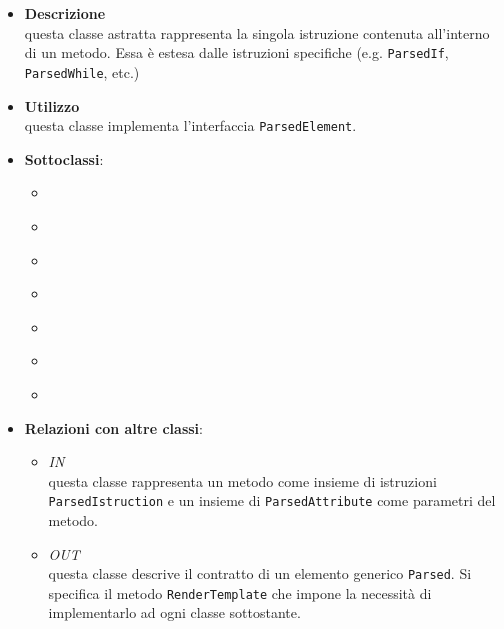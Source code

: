 \label{\nogloxy{swedesigner::server::project::ParsedInstruction}}
\begin{itemize}
\item \textbf{Descrizione}\\
questa classe astratta rappresenta la singola istruzione contenuta all'interno di un metodo. Essa è estesa dalle istruzioni specifiche (e.g. \texttt{ParsedIf}, \texttt{ParsedWhile}, etc.)
\item \textbf{Utilizzo}\\
questa classe implementa l'interfaccia \texttt{ParsedElement}.
\item \textbf{Sottoclassi}:
\begin{itemize}
\item \hyperref[\nogloxy{swedesigner::server::project::ParsedAssignment}]{}
\item \hyperref[\nogloxy{swedesigner::server::project::ParsedCustom}]{}
\item \hyperref[\nogloxy{swedesigner::server::project::ParsedFor}]{}
\item \hyperref[\nogloxy{swedesigner::server::project::ParsedIf}]{}
\item \hyperref[\nogloxy{swedesigner::server::project::ParsedInitialize}]{}
\item \hyperref[\nogloxy{swedesigner::server::project::ParsedReturn}]{}
\item \hyperref[\nogloxy{swedesigner::server::project::ParsedWhile}]{}
\end{itemize}
\item \textbf{Relazioni con altre classi}:
\begin{itemize}
\item \textit{IN} \hyperref[\nogloxy{swedesigner::server::project::ParsedMethod}]{}\\
questa classe rappresenta un metodo come insieme di istruzioni \texttt{ParsedIstruction} e un insieme di \texttt{ParsedAttribute} come parametri del metodo.
\item \textit{OUT} \hyperref[\nogloxy{swedesigner::server::project::ParsedElement}]{}\\
questa classe descrive il contratto di un elemento generico \texttt{Parsed}. Si specifica il metodo \texttt{RenderTemplate} che impone la necessità di implementarlo ad ogni classe sottostante.
\end{itemize}
\end{itemize}

